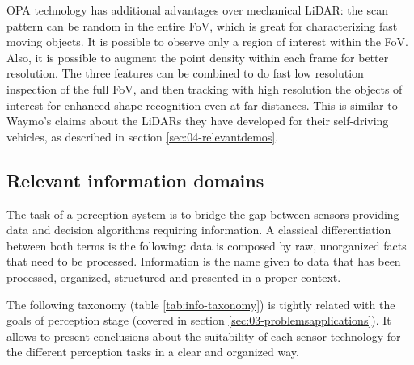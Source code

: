 OPA technology has additional advantages over mechanical LiDAR: the scan 
pattern can be random in the entire FoV, which is great for characterizing fast 
moving objects. It is possible to observe only a region of interest within the 
FoV. Also, it is possible to augment the point density within each frame for 
better resolution. The three features can be combined to do fast low resolution 
inspection of the full FoV, and then tracking with high resolution the objects
of interest for enhanced shape recognition even at far distances.
This is similar to Waymo's claims about the LiDARs they have developed for their
self-driving vehicles, as described in section \ref{sec:04-relevantdemos}.

\subsection{Relevant information domains}
\label{sec:03-d-information-domains}

The task of a perception system is to bridge the gap between sensors providing 
data and decision algorithms requiring information.
A classical differentiation between both terms is the following: data is 
composed by raw, unorganized facts that need to be processed. 
Information is the name given to data that has been processed, organized, 
structured and presented in a proper context.

The following taxonomy (table \ref{tab:info-taxonomy}) is tightly related with 
the goals of perception stage (covered in section
\ref{sec:03-problemsapplications}). It allows to present conclusions about the
suitability of each sensor technology for the different perception tasks in a
clear and organized way.

